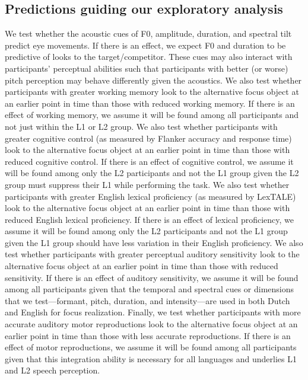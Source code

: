 \subsection{Predictions guiding our exploratory analysis} 
We test whether the acoustic cues of F0, amplitude, duration, and spectral tilt predict eye movements. If there is an effect, we expect F0 and duration to be predictive of looks to the target/competitor. These cues may also interact with participants' perceptual abilities such that participants with better (or worse) pitch perception may behave differently given the acoustics. We also test whether participants with greater working memory look to the alternative focus object at an earlier point in time than those with reduced working memory. If there is an effect of working memory, we assume it will be found among all participants and not just within the L1 or L2 group. We also test whether participants with greater cognitive control (as measured by Flanker accuracy and response time) look to the alternative focus object at an earlier point in time than those with reduced cognitive control. If there is an effect of cognitive control, we assume it will be found among only the L2 participants and not the L1 group given the L2 group must suppress their L1 while performing the task. We also test whether participants with greater English lexical proficiency (as measured by LexTALE) look to the alternative focus object at an earlier point in time than those with reduced English lexical proficiency. If there is an effect of lexical proficiency, we assume it will be found among only the L2 participants and not the L1 group given the L1 group should have less variation in their English proficiency. We also test whether participants with greater perceptual auditory sensitivity look to the alternative focus object at an earlier point in time than those with reduced sensitivity. If there is an effect of auditory sensitivity, we assume it will be found among all participants given that the temporal and spectral cues or dimensions that we test---formant, pitch, duration, and intensity---are used in both Dutch and English for focus realization. Finally, we test whether participants with more accurate auditory motor reproductions look to the alternative focus object at an earlier point in time than those with less accurate reproductions. If there is an effect of motor reproductions, we assume it will be found among all participants given that this integration ability is necessary for all languages and underlies L1 and L2 speech perception.
